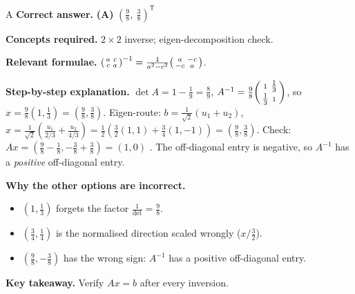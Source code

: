 \documentclass[11pt,a4paper]{article}
\newcommand{\qsep}{\par\vspace{2pt}{\color{black!15}\hrule}\vspace{4pt}}
\begin{document}
\begin{solbox}{A}
\textbf{\color{brand}Correct answer.} \textcolor{okgreen}{\textbf{(A)}} $(\tfrac98,\ \tfrac38)^{\mathsf T}$

\textbf{\color{brand}Concepts required.} $2\times2$ inverse; eigen-decomposition check.

\textbf{\color{brand}Relevant formulae.} $\begin{psmallmatrix}a&c\\c&a\end{psmallmatrix}^{-1} = \frac{1}{a^2 - c^2}\begin{psmallmatrix}a&-c\\-c&a\end{psmallmatrix}$.

\textbf{\color{brand}Step-by-step explanation.} $\det A = 1 - \tfrac19 = \tfrac89$, $A^{-1} = \tfrac98\begin{psmallmatrix}1 & \tfrac13\\ \tfrac13 & 1\end{psmallmatrix}$, so $x = \tfrac98(1, \tfrac13) = (\tfrac98, \tfrac38)$.
Eigen-route: $b = \tfrac{1}{\sqrt2}(u_1 + u_2)$, $x = \tfrac{1}{\sqrt2}\left(\tfrac{u_1}{2/3} + \tfrac{u_2}{4/3}\right) = \tfrac12\left(\tfrac32(1,1) + \tfrac34(1,-1)\right) = (\tfrac98, \tfrac38)$.
Check: $A x = (\tfrac98 - \tfrac18, -\tfrac38 + \tfrac38) = (1, 0)$ \checkmark. The off-diagonal entry is negative, so $A^{-1}$ has a \emph{positive} off-diagonal entry.

\textbf{\color{brand}Why the other options are incorrect.}
\begin{itemize}[leftmargin=2.4em, itemsep=1pt, topsep=2pt]
\item[\textbf{(B)}] $(1, \frac13)$ forgets the factor $\frac{1}{\det} = \frac98$.
\item[\textbf{(C)}] $(\frac34, \frac14)$ is the normalised direction scaled wrongly ($x/\frac32$).
\item[\textbf{(D)}] $(\frac98, -\frac38)$ has the wrong sign: $A^{-1}$ has a positive off-diagonal entry.
\end{itemize}
\textbf{\color{brand}Key takeaway.} Verify $Ax = b$ after every inversion.
\end{solbox}
\qsep
\end{document}
